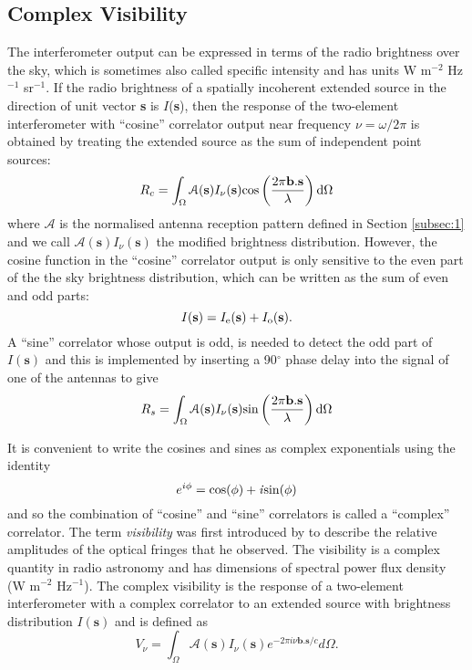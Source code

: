 \subsection{Complex Visibility}\label{subsec:6}
The interferometer output can be expressed in terms of the radio brightness over the sky, which is sometimes also called specific intensity and has units W m$^{-2}$ Hz$^{-1}$ sr$^{-1}$. If the radio brightness of a spatially incoherent extended source in the direction of unit vector \textbf{s} is $I$(\textbf{s}), then the response of the two-element interferometer with ``cosine'' correlator output near frequency $\nu =\omega/2\pi$ is obtained by treating the extended source as the sum of independent point sources:
\begin{equation}
R_{c}=\int _{\Omega}\mathcal{A}(\textbf{s})I_{\nu}(\textbf{s}) \rm{cos}\left(\frac{2\pi \textbf{b}.\textbf{s}}{\lambda} \right)d\Omega
\end{equation}
where $\mathcal{A}$ is the normalised antenna reception pattern defined in Section \ref{subsec:1} and we call $\mathcal{A}(\textbf{s})I_{\nu}(\textbf{s})$ the modified brightness distribution. However, the cosine function in the  ``cosine'' correlator output is only sensitive to the even part of the the sky brightness distribution, which can be written as the sum of even and odd parts:
\begin{equation}
I(\textbf{s})=I_{\rm{e}}(\textbf{s})+I_{\rm{o}}(\textbf{s}).
\end{equation}
A ``sine'' correlator whose output is odd, is needed to detect the odd part of $I(\textbf{s})$ and this is implemented by inserting a 90$^{\circ}$ phase delay into the signal of one of the antennas to give
\begin{equation}
R_{s}=\int _{\Omega}\mathcal{A}(\textbf{s})I_{\nu}(\textbf{s}) \rm{sin}\left(\frac{2\pi \textbf{b}.\textbf{s}}{\lambda} \right)d\Omega
\end{equation}

It is convenient to write the cosines and sines as complex exponentials using the identity 
\begin{equation}
e^{i\phi} = \rm{cos}(\phi) + \mathit{i}\rm{sin}(\phi)
\end{equation}
and so the combination of ``cosine'' and ``sine'' correlators is called a ``complex'' correlator. The term \textit{visibility} was first introduced by \cite{michelson_1890} to describe the relative amplitudes of the optical fringes that he observed. The visibility is a complex quantity in radio astronomy and has dimensions of spectral power flux density (W m$^{-2}$ Hz$^{-1}$). The complex visibility is the response of a two-element interferometer with a complex correlator to an extended source with brightness distribution $I(\textbf{s})$  and is defined as
\begin{equation}
V _{\nu} = \int _{\Omega}\mathcal{A}(\textbf{s})I_{\nu}(\textbf{s})\mathit{e}^{-2\pi \mathit{i} \nu \textbf{b}.\textbf{s}/c}d\Omega .
\label{eq:visib}
\end{equation}

